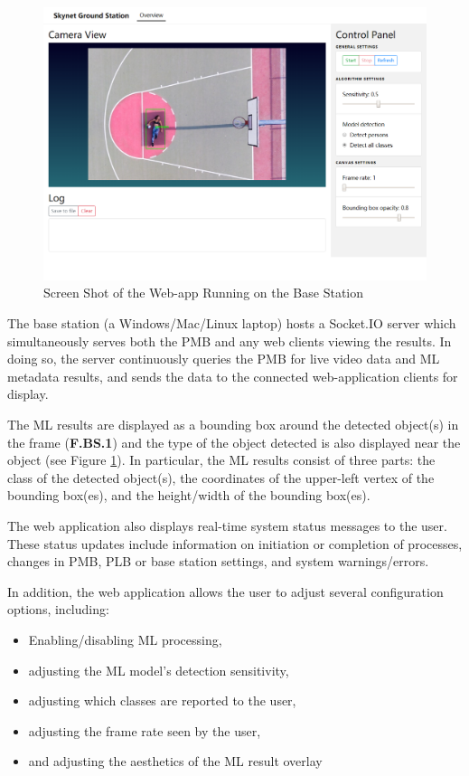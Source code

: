 \begin{figure}[H]
\begin{mdframed}
\centering
\includegraphics[width=15cm]{img/base_station.png}
\end{mdframed}
\caption{Screen Shot of the Web-app Running on the Base Station}
\label{basestationdiag}
\end{figure}

The base station (a Windows/Mac/Linux laptop) hosts a Socket.IO server which simultaneously serves both the PMB and any web clients viewing the results. In doing so, the server continuously queries the PMB for live video data and ML metadata results, and sends the data to the connected web-application clients for display.

The ML results are displayed as a bounding box around the detected object(s) in the frame (\textbf{F.BS.1}) and the type of the object detected is also displayed near the object (see Figure \ref{basestationdiag}). In particular, the ML results consist of three parts: the class of the detected object(s), the coordinates of the upper-left vertex of the bounding box(es), and the height/width of the bounding box(es).

The web application also displays real-time system status messages to the user. These status updates include information on initiation or completion of processes, changes in PMB, PLB or base station settings, and system warnings/errors.

In addition, the web application allows the user to adjust several configuration options, including:

\begin{itemize}
\item Enabling/disabling ML processing,
\item adjusting the ML model's detection sensitivity,
\item adjusting which classes are reported to the user,
\item adjusting the frame rate seen by the user,
\item and adjusting the aesthetics of the ML result overlay
\end{itemize}

